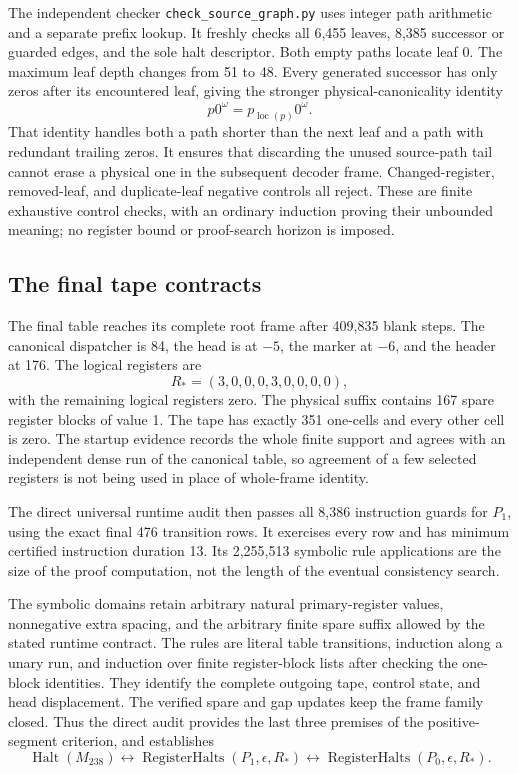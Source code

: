The independent checker \texttt{check\_source\_graph.py} uses integer
path arithmetic and a separate prefix lookup.  It freshly checks all
6,455 leaves, 8,385 successor or guarded edges, and the sole halt
descriptor.  Both empty paths locate leaf 0.  The maximum leaf depth
changes from 51 to 48.  Every generated successor has only zeros after
its encountered leaf, giving the stronger physical-canonicality identity
\[
 p0^\omega=p_{\operatorname{loc}(p)}0^\omega.
\]
That identity handles both a path shorter than the next leaf and a path
with redundant trailing zeros.  It ensures that discarding the unused
source-path tail cannot erase a physical one in the subsequent decoder
frame.  Changed-register, removed-leaf, and duplicate-leaf negative
controls all reject.  These are finite exhaustive control checks, with
an ordinary induction proving their unbounded meaning; no register bound
or proof-search horizon is imposed.

\subsection{The final tape contracts}

The final table reaches its complete root frame after 409,835 blank
steps.  The canonical dispatcher is 84, the head is at $-5$, the marker
at $-6$, and the header at 176.  The logical registers are
\[
 R_*=(3,0,0,0,3,0,0,0,0),
\]
with the remaining logical registers zero.  The physical suffix contains
167 spare register blocks of value 1.  The tape has exactly 351 one-cells
and every other cell is zero.  The startup evidence records the whole
finite support and agrees with an independent dense run of the canonical
table, so agreement of a few selected registers is not being used in
place of whole-frame identity.

The direct universal runtime audit then passes all 8,386 instruction
guards for $P_1$, using the exact final 476 transition rows.  It exercises
every row and has minimum certified instruction duration 13.  Its
2,255,513 symbolic rule applications are the size of the proof computation,
not the length of the eventual consistency search.

The symbolic domains retain arbitrary natural primary-register values,
nonnegative extra spacing, and the arbitrary finite spare suffix allowed
by the stated runtime contract.  The rules are literal table transitions,
induction along a unary run, and induction over finite register-block
lists after checking the one-block identities.  They identify the complete
outgoing tape, control state, and head displacement.  The verified spare
and gap updates keep the frame family closed.  Thus the direct audit
provides the last three premises of the positive-segment criterion, and
establishes
\[
 \operatorname{Halt}(M_{238})
 \longleftrightarrow
 \operatorname{RegisterHalts}(P_1,\epsilon,R_*)
 \longleftrightarrow
 \operatorname{RegisterHalts}(P_0,\epsilon,R_*).
\]

